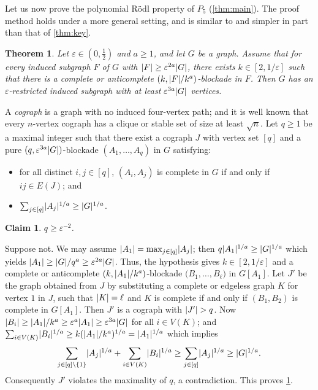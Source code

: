 \documentclass[11pt,reqno,a4paper]{amsart}
\newtheorem{theorem}{Theorem}[section]
\newtheorem{claim}{Claim}[theorem]
\let\oldendproof\endproof
\renewenvironment{proof}[1][\proofname]{%
	\oldproof[\normalfont\bfseries #1]%
}{\oldendproof}
\renewcommand{\qedsymbol}{$\blacksquare$}%
\newenvironment{subproof}[1][\normalfont\it Subproof]{%
	\renewcommand{\qedsymbol}{$\square$}%
	\begin{proof}[#1]%
	}{%
	\end{proof}%
}
\newcommand{\mac}{\mathcal}
\newcommand{\eps}{\varepsilon}
\DeclarePairedDelimiter\abs{\lvert}{\rvert}%
\begin{document}
	Let us now prove the polynomial R\"odl property of $P_5$ (\cref{thm:main}).
	The proof method holds under a more general setting, and is similar to and simpler in part than that of \cref{thm:key}.
	\begin{theorem}
		\label{thm:blocks}
		Let $\eps\in(0,\frac12)$ and $a\ge1$, and let $G$ be a graph.
		Assume that for every induced subgraph $F$ of $G$ with $\abs F\ge\eps^{2a}\abs G$, there exists $k\in[2,1/\eps]$ such that there is a complete or anticomplete $(k,\abs F/k^a)$-blockade in $F$.
		Then $G$ has an $\eps$-restricted induced subgraph with at least $\eps^{3a}\abs G$ vertices.
	\end{theorem}
	\begin{proof}
		A {\em cograph} is a graph with no induced four-vertex path;
		and it is well known that every $n$-vertex cograph has a clique or stable set of size at least $\sqrt n$.
		Let $q\ge1$ be a maximal integer such that there exist a cograph $J$ with vertex set $[q]$ and a pure $(q,\eps^{3a}\abs G)$-blockade $(A_1,\ldots,A_q)$ in $G$ satisfying:
		\begin{itemize}
			\item for all distinct $i,j\in [q]$, $(A_i,A_j)$ is complete in $G$ if and only if $ij\in E(J)$; and
			
			\item $\sum_{j\in [q]}\abs{A_j}^{1/a}\ge\abs G^{1/a}$.
		\end{itemize}
		\begin{claim}
			\label{claim:length}
			$q\ge\eps^{-2}$.
		\end{claim}
		\begin{subproof}
			Suppose not. We may assume $\abs{A_1}=\max_{j\in[q]}\abs{A_j}$;
			then $q \abs{A_1}^{1/a}\ge\abs G^{1/a}$
			which yields $\abs{A_1}\ge \abs G/q^a\ge \eps^{2a}\abs G$.
			Thus, the hypothesis gives $k\in[2,1/\eps]$ and a complete or anticomplete $(k,\abs {A_1}/k^a)$-blockade $\mac (B_1,\ldots,B_{\ell})$ in $G[A_1]$.
			Let $J'$ be the graph obtained from $J$ by substituting a complete or edgeless graph $K$ for vertex $1$ in $J$,
			such that $\abs K=\ell$ and $K$ is complete if and only if $(B_1,B_2)$ is complete in $G[A_1]$.
			Then $J'$ is a cograph with $\abs{J'}>q$.
			Now $\abs{B_i}\ge\abs{A_1}/k^a\ge \eps^{a}\abs{A_1}\ge\eps^{3a}\abs G$ for all $i\in V(K)$; and
			$\sum_{i\in V(K)}\abs{B_i}^{1/a}\ge k(\abs{A_1}/k^a)^{1/a}=\abs{A_1}^{1/a}$ which implies
			\[\sum_{j\in [q]\setminus\{1\}}\abs{A_j}^{1/a}
			+\sum_{i\in V(K)}\abs{B_i}^{1/a}
			\ge \sum_{j\in [q]}\abs{A_j}^{1/a}
			\ge \abs G^{1/a}.\]
			Consequently $J'$ violates the maximality of $q$, a contradiction.
			This proves \cref{claim:length}.
		\end{subproof}
		

\end{proof}
\end{document}

